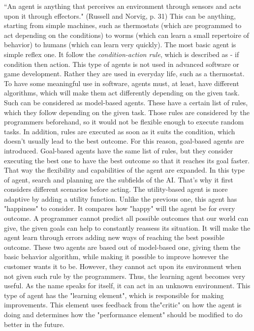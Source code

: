 \documentclass{scrartcl}
\begin{document}
``An agent is anything that perceives an environment through sensors and acts upon it through effectors." (Russell and Norvig, p. 31) 
This can be anything, starting from simple machines, such as thermostats (which are programmed to act depending on the conditions) 
to worms (which can learn a small repertoire of behavior) to humans (which can learn very quickly). 
The most basic agent is simple reflex one.
It follow the \textit{condition-action rule}, which is described as - if condition then action.
This type of agents is not used in advanced software or game development.
Rather they are used in everyday life, such as a thermostat.
To have some meaningful use in software, agents must, at least, have different algorithms, which will make them act differently depending on the given task. 
Such can be considered as model-based agents.
These have a certain list of rules, which they follow depending on the given task.
Those rules are considered by the programmers beforehand, so it would not be flexible enough to execute random tasks.
In addition, rules are executed as soon as it suits the condition, which doesn't usually lead to the best outcome.
For this reason, goal-based agents are introduced.
Goal-based agents have the same list of rules, but they consider executing the best one to have the best outcome so that it reaches its goal faster.
That way the flexibility and capabilities of the agent are expanded.
In this type of agent, search and planning are the subfields of the AI.
That's why it first considers different scenarios before acting.
The utility-based agent is more adaptive by adding a utility function.
Unlike the previous one, this agent has "happiness" to consider.
It compares how "happy" will the agent be for every outcome.
A programmer cannot predict all possible outcomes that our world can give, the given goals can help to constantly reassess its situation.
It will make the agent learn through errors adding new ways of reaching the best possible outcome.
These two agents are based out of model-based one, giving them the basic behavior algorithm, while making it possible to improve however the customer wants it to be.
However, they cannot act upon its environment when not given such rule by the programmers.
Thus, the learning agent becomes very useful.
As the name speaks for itself, it can act in an unknown environment.
This type of agent has the "learning element", which is responsible for making improvements.
This element uses feedback from the"critic" on how the agent is doing and determines how the "performance element" should be modified to do better in the future.
\end{document}
